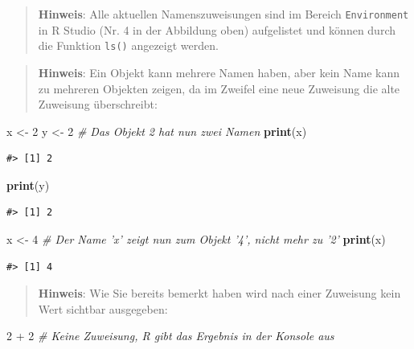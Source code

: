 \documentclass[]{tufte-book}
\newenvironment{Shaded}{}{}
\newcommand{\KeywordTok}[1]{\textcolor[rgb]{0.00,0.44,0.13}{\textbf{#1}}}
\newcommand{\DecValTok}[1]{\textcolor[rgb]{0.25,0.63,0.44}{#1}}
\newcommand{\StringTok}[1]{\textcolor[rgb]{0.25,0.44,0.63}{#1}}
\newcommand{\CommentTok}[1]{\textcolor[rgb]{0.38,0.63,0.69}{\textit{#1}}}
\newcommand{\OperatorTok}[1]{\textcolor[rgb]{0.40,0.40,0.40}{#1}}
\newcommand{\NormalTok}[1]{#1}
\begin{document}
\begin{quote}
\textbf{Hinweis}: Alle aktuellen Namenszuweisungen sind im Bereich
\texttt{Environment} in R Studio (Nr. 4 in der Abbildung oben)
aufgelistet und können durch die Funktion \texttt{ls()} angezeigt
werden.
\end{quote}

\begin{quote}
\textbf{Hinweis}: Ein Objekt kann mehrere Namen haben, aber kein Name
kann zu mehreren Objekten zeigen, da im Zweifel eine neue Zuweisung die
alte Zuweisung überschreibt:
\end{quote}

\begin{Shaded}
\begin{Highlighting}[]
\NormalTok{x <-}\StringTok{ }\DecValTok{2}
\NormalTok{y <-}\StringTok{ }\DecValTok{2}  \CommentTok{# Das Objekt 2 hat nun zwei Namen}
\KeywordTok{print}\NormalTok{(x)}
\end{Highlighting}
\end{Shaded}

\begin{verbatim}
#> [1] 2
\end{verbatim}

\begin{Shaded}
\begin{Highlighting}[]
\KeywordTok{print}\NormalTok{(y)}
\end{Highlighting}
\end{Shaded}

\begin{verbatim}
#> [1] 2
\end{verbatim}

\begin{Shaded}
\begin{Highlighting}[]
\NormalTok{x <-}\StringTok{ }\DecValTok{4}  \CommentTok{# Der Name 'x' zeigt nun zum Objekt '4', nicht mehr zu '2'}
\KeywordTok{print}\NormalTok{(x)}
\end{Highlighting}
\end{Shaded}

\begin{verbatim}
#> [1] 4
\end{verbatim}

\begin{quote}
\textbf{Hinweis}: Wie Sie bereits bemerkt haben wird nach einer
Zuweisung kein Wert sichtbar ausgegeben:
\end{quote}

\begin{Shaded}
\begin{Highlighting}[]
\DecValTok{2} \OperatorTok{+}\StringTok{ }\DecValTok{2}  \CommentTok{# Keine Zuweisung, R gibt das Ergebnis in der Konsole aus}
\end{Highlighting}
\end{Shaded}
\end{document}

